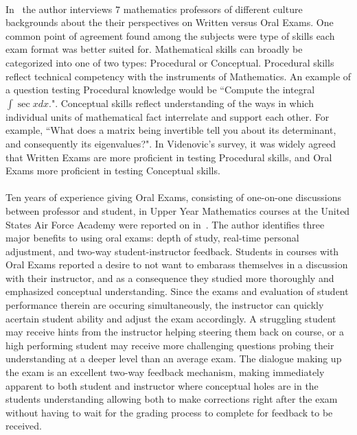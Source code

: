 \documentclass[12pt]{article}
\begin{document}
\paragraph{}
In~\cite{videnovic2017oral} the author interviews $7$ mathematics professors of different culture backgrounds about the their perspectives on Written versus Oral Exams. One common point of agreement found among the subjects were type of skills each exam format was better suited for. Mathematical skills can broadly be categorized into one of two types: Procedural or Conceptual. Procedural skills reflect technical competency with the instruments of Mathematics. An example of a question testing Procedural knowledge would be ``Compute the integral $\int\sec x dx.$". Conceptual skills reflect understanding of the ways in which individual units of mathematical fact interrelate and support each other. For example, ``What does a matrix being invertible tell you about its determinant, and consequently its eigenvalues?". In Videnovic's survey, it was widely agreed that Written Exams are more proficient in testing Procedural skills, and Oral Exams more proficient in testing Conceptual skills.
\paragraph{}
Ten years of experience giving Oral Exams, consisting of one-on-one discussions between professor and student, in Upper Year Mathematics courses at the United States Air Force Academy were reported on in~\cite{boedigheimer2015individual}. The author identifies three major benefits to using oral exams: depth of study, real-time personal adjustment, and two-way student-instructor feedback. Students in courses with Oral Exams reported a desire to not want to embarass themselves in a discussion with their instructor, and as a consequence they studied more thoroughly and emphasized conceptual understanding. Since the exams and evaluation of student performance therein are occuring simultaneously, the instructor can quickly acertain student ability and adjust the exam accordingly. A struggling student may receive hints from the instructor helping steering them back on course, or a high performing student may receive more challenging questions probing their understanding at a deeper level than an average exam. The dialogue making up the exam is an excellent two-way feedback mechanism, making immediately apparent to both student and instructor where conceptual holes are in the students understanding allowing both to make corrections right after the exam without having to wait for the grading process to complete for feedback to be received.
\end{document}
